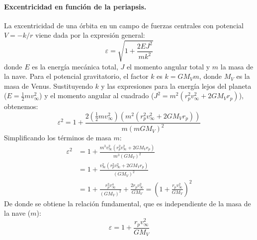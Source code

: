 \paragraph{Excentricidad en función de la periapsis.}
La excentricidad de una órbita en un campo de fuerzas centrales con potencial $V = -k/r$ viene dada por la expresión general:
\begin{equation}
    \varepsilon = \sqrt{1 + \frac{2 E J^2}{m k^2}}
\end{equation}
donde $E$ es la energía mecánica total, $J$ el momento angular total y $m$ la masa de la nave. Para el potencial gravitatorio, el factor $k$ es $k = G M_V m$, donde $M_V$ es la masa de Venus.
\newpage
Sustituyendo $k$ y las expresiones para la energía lejos del planeta ($E = \frac{1}{2}mv_\infty^2$) y el momento angular al cuadrado ($J^2 = m^2(r_p^2 v_\infty^2 + 2 G M_V r_p)$), obtenemos:
\begin{equation}
    \varepsilon^2 = 1 + \frac{2 \left(\frac{1}{2}mv_\infty^2\right) \left(m^2(r_p^2 v_\infty^2 + 2 G M_V r_p)\right)}{m(m G M_V)^2}
\end{equation}
Simplificando los términos de masa $m$:
\begin{align}
    \varepsilon^2 &= 1 + \frac{m^3 v_\infty^2 (r_p^2 v_\infty^2 + 2 G M_V r_p)}{m^3 (G M_V)^2} \nonumber \\
    &= 1 + \frac{v_\infty^2 (r_p^2 v_\infty^2 + 2 G M_V r_p)}{(G M_V)^2} \nonumber \\
    &= 1 + \frac{r_p^2 v_\infty^4}{(G M_V)^2} + \frac{2 r_p v_\infty^2}{G M_V} = \left(1 + \frac{r_p v_\infty^2}{G M_V}\right)^2
\end{align}
De donde se obtiene la relación fundamental, que es independiente de la masa de la nave ($m$):
\begin{equation}
    \varepsilon = 1 + \frac{r_p v_\infty^2}{G M_V}
\end{equation}

